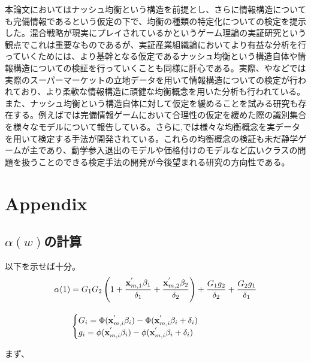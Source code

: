 \documentclass{jsarticle}
\begin{document}
本論文においてはナッシュ均衡という構造を前提とし、さらに情報構造についても完備情報であるという仮定の下で、均衡の種類の特定化についての検定を提示した。混合戦略が現実にプレイされているかというゲーム理論の実証研究という観点でこれは重要なものであるが、実証産業組織論においてより有益な分析を行っていくためには、より基幹となる仮定であるナッシュ均衡という構造自体や情報構造についての検証を行っていくことも同様に肝心である。実際、\cite{Grieco2014a}や\cite{Magnolfi2015}などでは実際のスーパーマーケットの立地データを用いて情報構造についての検定が行われており、より柔軟な情報構造に頑健な均衡概念を用いた分析も行われている。また、ナッシュ均衡という構造自体に対して仮定を緩めることを試みる研究も存在する。例えば\cite{Aradillas-Lopez2008}では完備情報ゲームにおいて合理性の仮定を緩めた際の識別集合を様々なモデルについて報告している。さらに\cite{Kashaev2017},\cite{Kashaev2016}では様々な均衡概念を実データを用いて検定する手法が開発されている。これらの均衡概念の検証も未だ静学ゲームが主であり、動学参入退出のモデルや価格付けのモデルなど広いクラスの問題を扱うことのできる検定手法の開発が今後望まれる研究の方向性である。

\section{Appendix}
\subsection{$\alpha(w)$の計算}
以下を示せば十分。
\begin{align*}
	\alpha(1)& = G_1 G_2 \left( 1 + \frac{{\bf x}_{m, 1}^{'} \beta_1}{\delta_1} + \frac{{\bf x}_{m, 2}^{'} \beta_2}{\delta_2} \right) + \frac{G_1g_2}{\delta_2} + \frac{G_2g_1}{\delta_1}\\[10pt]
	&\begin{cases}
	G_i =  \Phi({\bf x}_{m, i}^{'} \beta_i) - \Phi({\bf x}_{m, i}^{'} \beta_i  + \delta_i)\\
	g_i = \phi({\bf x}_{m, i}^{'} \beta_i) - \phi({\bf x}_{m, i}^{'} \beta_i  + \delta_i)
	\end{cases}
\end{align*}

まず、
\end{document}
